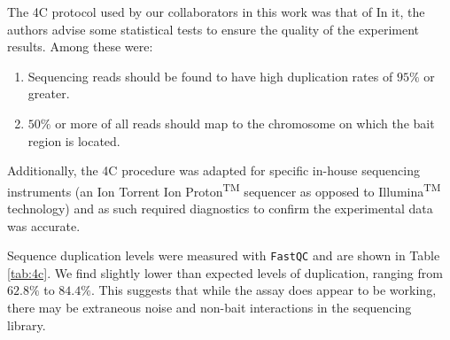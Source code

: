 \documentclass[a4paper,11pt,oneside]{book}
\begin{document}
The 4C protocol used by our collaborators in this work was that of \citet{Stadhouders2013} In it, the authors advise some statistical tests to ensure the quality of the experiment results. Among these were:\cite{Stadhouders2013}

\begin{enumerate}
\item Sequencing reads should be found to have high duplication rates of $95\%$ or greater.
\item $50\%$ or more of all reads should map to the chromosome on which the bait region is located.
\end{enumerate}


Additionally, the 4C procedure was adapted for specific in-house sequencing instruments (an Ion Torrent Ion Proton\textsuperscript{TM} sequencer as opposed to Illumina\textsuperscript{TM} technology) and as such required diagnostics to confirm the experimental data was accurate. 

Sequence duplication levels were measured with \texttt{FastQC}\cite{fastqc} and are shown in Table \ref{tab:4c}. We find slightly lower than expected levels of duplication, ranging from $62.8\%$ to $84.4\%$. This suggests that while the assay does appear to be working, there may be extraneous noise and non-bait interactions in the sequencing library.
\end{document}
